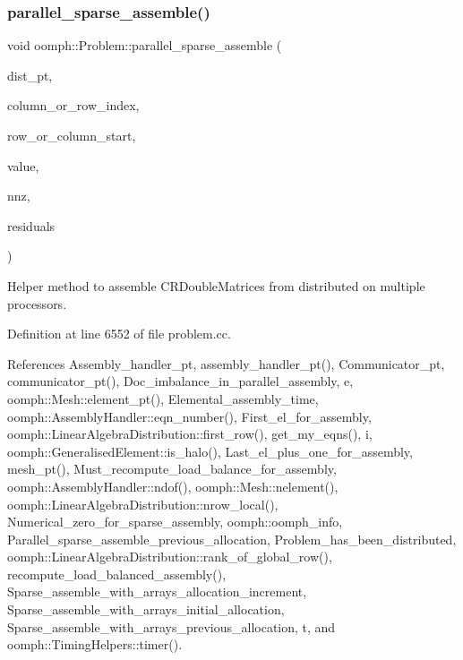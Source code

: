 \subsubsection{\texorpdfstring{parallel\+\_\+sparse\+\_\+assemble()}{parallel\_sparse\_assemble()}}
{\footnotesize\ttfamily void oomph\+::\+Problem\+::parallel\+\_\+sparse\+\_\+assemble (\begin{DoxyParamCaption}\item[{const \hyperlink{classoomph_1_1LinearAlgebraDistribution}{Linear\+Algebra\+Distribution} $\ast$const \&}]{dist\+\_\+pt,  }\item[{\hyperlink{classoomph_1_1Vector}{Vector}$<$ int $\ast$ $>$ \&}]{column\+\_\+or\+\_\+row\+\_\+index,  }\item[{\hyperlink{classoomph_1_1Vector}{Vector}$<$ int $\ast$ $>$ \&}]{row\+\_\+or\+\_\+column\+\_\+start,  }\item[{\hyperlink{classoomph_1_1Vector}{Vector}$<$ double $\ast$ $>$ \&}]{value,  }\item[{\hyperlink{classoomph_1_1Vector}{Vector}$<$ unsigned $>$ \&}]{nnz,  }\item[{\hyperlink{classoomph_1_1Vector}{Vector}$<$ double $\ast$ $>$ \&}]{residuals }\end{DoxyParamCaption})\hspace{0.3cm}{\ttfamily [private]}}



Helper method to assemble C\+R\+Double\+Matrices from distributed on multiple processors. 



Definition at line 6552 of file problem.\+cc.



References Assembly\+\_\+handler\+\_\+pt, assembly\+\_\+handler\+\_\+pt(), Communicator\+\_\+pt, communicator\+\_\+pt(), Doc\+\_\+imbalance\+\_\+in\+\_\+parallel\+\_\+assembly, e, oomph\+::\+Mesh\+::element\+\_\+pt(), Elemental\+\_\+assembly\+\_\+time, oomph\+::\+Assembly\+Handler\+::eqn\+\_\+number(), First\+\_\+el\+\_\+for\+\_\+assembly, oomph\+::\+Linear\+Algebra\+Distribution\+::first\+\_\+row(), get\+\_\+my\+\_\+eqns(), i, oomph\+::\+Generalised\+Element\+::is\+\_\+halo(), Last\+\_\+el\+\_\+plus\+\_\+one\+\_\+for\+\_\+assembly, mesh\+\_\+pt(), Must\+\_\+recompute\+\_\+load\+\_\+balance\+\_\+for\+\_\+assembly, oomph\+::\+Assembly\+Handler\+::ndof(), oomph\+::\+Mesh\+::nelement(), oomph\+::\+Linear\+Algebra\+Distribution\+::nrow\+\_\+local(), Numerical\+\_\+zero\+\_\+for\+\_\+sparse\+\_\+assembly, oomph\+::oomph\+\_\+info, Parallel\+\_\+sparse\+\_\+assemble\+\_\+previous\+\_\+allocation, Problem\+\_\+has\+\_\+been\+\_\+distributed, oomph\+::\+Linear\+Algebra\+Distribution\+::rank\+\_\+of\+\_\+global\+\_\+row(), recompute\+\_\+load\+\_\+balanced\+\_\+assembly(), Sparse\+\_\+assemble\+\_\+with\+\_\+arrays\+\_\+allocation\+\_\+increment, Sparse\+\_\+assemble\+\_\+with\+\_\+arrays\+\_\+initial\+\_\+allocation, Sparse\+\_\+assemble\+\_\+with\+\_\+arrays\+\_\+previous\+\_\+allocation, t, and oomph\+::\+Timing\+Helpers\+::timer().



